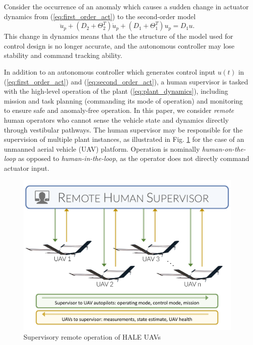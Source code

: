 \documentclass[english]{ifacconf}
\begin{document}
Consider the occurrence of an anomaly which causes a sudden change in actuator dynamics from (\ref{eq:first_order_act}) to the second-order model
\begin{equation}
	\ddot{u}_p + (D_2 + \Theta_2^T) \dot{u}_p + (D_1 + \Theta_1^T) u_p = D_1 u. \label{eq:second_order_act}
\end{equation}
This change in dynamics means that the the structure of the model used for control design is no longer accurate, and the autonomous controller may lose stability and command tracking ability.

In addition to an autonomous controller which generates control input $u(t)$ in (\ref{eq:first_order_act}) and (\ref{eq:second_order_act}), a human supervisor is tasked with the high-level operation of the plant (\ref{eq:plant_dynamics}), including mission and task planning (commanding its mode of operation) and monitoring to ensure safe and anomaly-free operation. In this paper, we consider \textit{remote} human operators who cannot sense the vehicle state and dynamics directly through vestibular pathways. The human supervisor may be responsible for the supervision of multiple plant instances, as illustrated in Fig. \ref{fig:uav_supervisor} for the case of an unmanned aerial vehicle (UAV) platform. Operation is nominally \textit{human-on-the-loop} as opposed to \textit{human-in-the-loop}, as the operator does not directly command actuator input. 

\begin{figure}[htbp]
	\centering
	\includegraphics[width=0.95\columnwidth]{../fig/uav_supervisor.pdf}
	\caption{Supervisory remote operation of HALE UAVs}
	\label{fig:uav_supervisor}
\end{figure}
\end{document}
